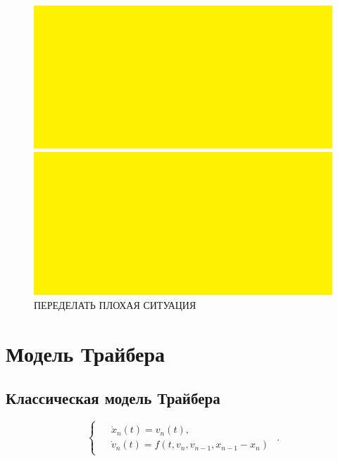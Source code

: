 \documentclass[12pt, a4paper]{extarticle}
\numberwithin{equation}{section}
\begin{document}
\begin{figure}[h!]
	\begin{center}
		\begin{minipage}[h!]{0.48\linewidth}
			\includegraphics[width=1\linewidth,height=0.2\textheight]
			{Images/test.png}
		\end{minipage}
		\hfill 
		\begin{minipage}[h!]{0.48\linewidth}
			\includegraphics[width=1\linewidth,height=0.2\textheight]
			{Images/test.png}
		\end{minipage}
		\caption{ПЕРЕДЕЛАТЬ ПЛОХАЯ СИТУАЦИЯ}
		\label{gazis_model_img_2}
	\end{center}
\end{figure}

\section{Модель Трайбера}

\subsection{Классическая модель Трайбера}
\begin{equation*}
\begin{cases}
\begin{split}
&\dot{x}_n(t) = v_n(t), \\
&\dot{v}_n(t)=f(t, v_n,v_{n-1},x_{n-1}-x_n)
\end{split}
\end{cases}.
\end{equation*}
\end{document}
